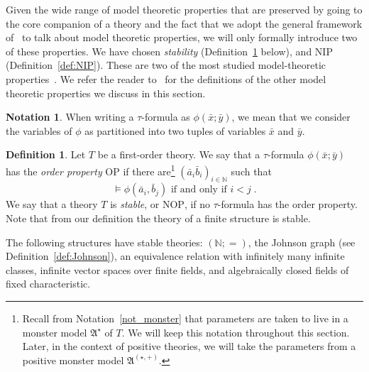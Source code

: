 \documentclass{amsart}
\theoremstyle{definition}
\newtheorem{definition}[theorem]{Definition}
\newtheorem{notation}[theorem]{Notation}
\theoremstyle{remark}
\numberwithin{equation}{section}
\newcommand{\fa}{\mathfrak{A}}
\begin{document}
Given the wide range of model theoretic properties 
that are %
preserved by going to the core companion  of a theory and the fact that we adopt the general framework of~\cite{bailetti2024walk} to talk about model theoretic properties, we will only formally introduce two of these properties. 
We have chosen 
\emph{stability} (Definition~\ref{def:stability} below), and $\mathrm{NIP}$ (Definition~\ref{def:NIP}). These are two of the most studied model-theoretic properties~\cite{pillay1996geometric, simon2015guide}. We refer the reader to~\cite{bailetti2024walk} for the definitions of the other model theoretic properties we discuss in this section.


\begin{notation} When writing a $\tau$-formula as $\phi(\bar{x};\bar{y})$, we mean that we consider the variables of $\phi$ as partitioned into two tuples of variables $\bar{x}$ and $\bar{y}$.
\end{notation}

\begin{definition}\label{def:stability} Let $T$ be a first-order theory. We say that a $\tau$-formula $\phi(\bar{x};\bar{y})$ has the \emph{order property} $\mathrm{OP}$ if there are\footnote{Recall from Notation~\ref{not_monster} that parameters are taken to live in a monster model $\fa^\star$ of $T$. We will keep this notation throughout this section. Later, in the context of positive theories, we will take the parameters from a positive monster model $\fa^{(\star, +)}$.} $(\bar{a}_i \bar{b}_i)_{i\in\mathbb{N}}$ such that
\[\vDash \phi(\bar{a}_i, \bar{b}_j) \text{ if and only if } i<j\;.\]
We say that a theory $T$ is \emph{stable}, or $\mathrm{NOP}$, if no $\tau$-formula has the order property. Note that from our definition the theory of a finite structure is stable.
\end{definition}

	The following structures have stable theories: $(\mathbb{N};=)$, the Johnson graph (see Definition~\ref{def:Johnson}),  an equivalence relation with infinitely many infinite classes,  infinite vector spaces over finite fields, and algebraically closed fields of fixed characteristic.
\end{document}
